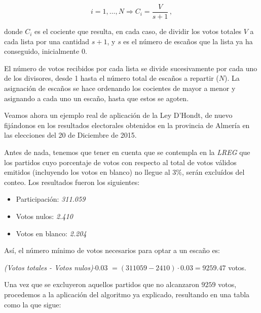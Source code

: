 \documentclass[11pt]{article}
\begin{document}
	$$i = 1,\ldots,N \Rightarrow C_i = \dfrac{V}{s + 1}\, ,$$
	
	donde $C_i$ es el cociente que resulta, en cada caso, de dividir los votos totales $V$ a cada lista por una cantidad $s + 1$, y $s$ es el número de escaños que la lista ya ha conseguido, inicialmente 0.
	
	El número de votos recibidos por cada lista se divide sucesivamente por cada uno de los divisores, desde 1 hasta el número total de escaños a repartir ($N$). La asignación de escaños se hace ordenando los cocientes de mayor a menor y asignando a cada uno un escaño, hasta que estos se agoten.
	
	Veamos ahora un ejemplo real de aplicación de la Ley D'Hondt, de nuevo fijándonos en los resultados electorales obtenidos en la provincia de Almería en las elecciones del 20 de Diciembre de 2015.
	
	Antes de nada, tenemos que tener en cuenta que se contempla en la \textit{LREG} que los partidos cuyo porcentaje de votos con respecto al total de votos válidos emitidos (incluyendo los votos en blanco) no llegue al 3\%, serán excluídos del conteo. Los resultados fueron los siguientes:
	
	\begin{itemize}
	\item Participación: \textit{311.059}
	\item Votos nulos: \textit{2.410}
	\item Votos en blanco: \textit{2.204} 
	\end{itemize}
	
	Así, el número mínimo de votos necesarios para optar a un escaño es:
	\begin{center}
	 \textit{(Votos totales - Votos nulos)$\cdot 0.03$} $= (311059 - 2410)\cdot 0.03 = 9259.47$ votos.
	\end{center}
	
	Una vez que se excluyeron aquellos partidos que no alcanzaron $9259$ votos, procedemos a la aplicación del algoritmo ya explicado, resultando en una tabla como la que sigue:
	
\end{document}
